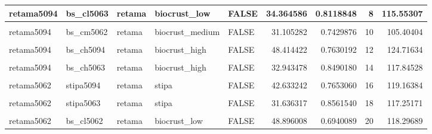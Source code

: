 \documentclass[]{article}
\begin{document}
\begin{table}[H]
\begin{tabular}[t]{l|l|l|l|l|r|r|r|r}
\hline
retama5094 & bs\_cl5063 & retama & biocrust\_low & FALSE & 34.364586 & 0.8118848 & 8 & 115.55307\\
\hline
\cellcolor{gray!6}{retama5094} & \cellcolor{gray!6}{bs\_cm5094} & \cellcolor{gray!6}{retama} & \cellcolor{gray!6}{biocrust\_medium} & \cellcolor{gray!6}{FALSE} & \cellcolor{gray!6}{44.099499} & \cellcolor{gray!6}{0.8808309} & \cellcolor{gray!6}{9} & \cellcolor{gray!6}{132.18258}\\
\hline
retama5094 & bs\_cm5062 & retama & biocrust\_medium & FALSE & 31.105282 & 0.7429876 & 10 & 105.40404\\
\hline
\cellcolor{gray!6}{retama5094} & \cellcolor{gray!6}{bs\_cm5063} & \cellcolor{gray!6}{retama} & \cellcolor{gray!6}{biocrust\_medium} & \cellcolor{gray!6}{FALSE} & \cellcolor{gray!6}{5.892976} & \cellcolor{gray!6}{0.8384753} & \cellcolor{gray!6}{11} & \cellcolor{gray!6}{89.74050}\\
\hline
retama5094 & bs\_ch5094 & retama & biocrust\_high & FALSE & 48.414422 & 0.7630192 & 12 & 124.71634\\
\hline
\cellcolor{gray!6}{retama5094} & \cellcolor{gray!6}{bs\_ch5062} & \cellcolor{gray!6}{retama} & \cellcolor{gray!6}{biocrust\_high} & \cellcolor{gray!6}{FALSE} & \cellcolor{gray!6}{38.305420} & \cellcolor{gray!6}{0.7500951} & \cellcolor{gray!6}{13} & \cellcolor{gray!6}{113.31493}\\
\hline
retama5094 & bs\_ch5063 & retama & biocrust\_high & FALSE & 32.943478 & 0.8490180 & 14 & 117.84528\\
\hline
\cellcolor{gray!6}{retama5062} & \cellcolor{gray!6}{retama5063} & \cellcolor{gray!6}{retama} & \cellcolor{gray!6}{retama} & \cellcolor{gray!6}{TRUE} & \cellcolor{gray!6}{32.057704} & \cellcolor{gray!6}{0.8394976} & \cellcolor{gray!6}{15} & \cellcolor{gray!6}{216.00746}\\
\hline
retama5062 & stipa5094 & retama & stipa & FALSE & 42.633242 & 0.7653060 & 16 & 119.16384\\
\hline
\cellcolor{gray!6}{retama5062} & \cellcolor{gray!6}{stipa5062} & \cellcolor{gray!6}{retama} & \cellcolor{gray!6}{stipa} & \cellcolor{gray!6}{FALSE} & \cellcolor{gray!6}{37.522843} & \cellcolor{gray!6}{0.5339814} & \cellcolor{gray!6}{17} & \cellcolor{gray!6}{90.92099}\\
\hline
retama5062 & stipa5063 & retama & stipa & FALSE & 31.636317 & 0.8561540 & 18 & 117.25171\\
\hline
\cellcolor{gray!6}{retama5062} & \cellcolor{gray!6}{bs\_cl5094} & \cellcolor{gray!6}{retama} & \cellcolor{gray!6}{biocrust\_low} & \cellcolor{gray!6}{FALSE} & \cellcolor{gray!6}{43.684561} & \cellcolor{gray!6}{0.7455036} & \cellcolor{gray!6}{19} & \cellcolor{gray!6}{118.23492}\\
\hline
retama5062 & bs\_cl5062 & retama & biocrust\_low & FALSE & 48.896008 & 0.6940089 & 20 & 118.29689\\
\hline
\end{tabular}
\end{table}
\end{document}
